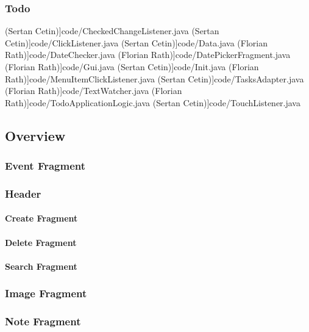 	\subsubsection{Todo}
 (Sertan Cetin)]{code/CheckedChangeListener.java}
 (Sertan Cetin)]{code/ClickListener.java}
 (Sertan Cetin)]{code/Data.java}
 (Florian Rath)]{code/DateChecker.java}
 (Florian Rath)]{code/DatePickerFragment.java}
 (Florian Rath)]{code/Gui.java}
 (Sertan Cetin)]{code/Init.java}
 (Florian Rath)]{code/MenuItemClickListener.java}
 (Sertan Cetin)]{code/TasksAdapter.java}
 (Florian Rath)]{code/TextWatcher.java}
 (Florian Rath)]{code/TodoApplicationLogic.java}
 (Sertan Cetin)]{code/TouchListener.java}


\subsection{Overview}
	\subsubsection{Event Fragment}
	\subsubsection{Header}
		\paragraph{Create Fragment}
		\paragraph{Delete Fragment}
		\paragraph{Search Fragment}
	\subsubsection{Image Fragment}
	\subsubsection{Note Fragment}
